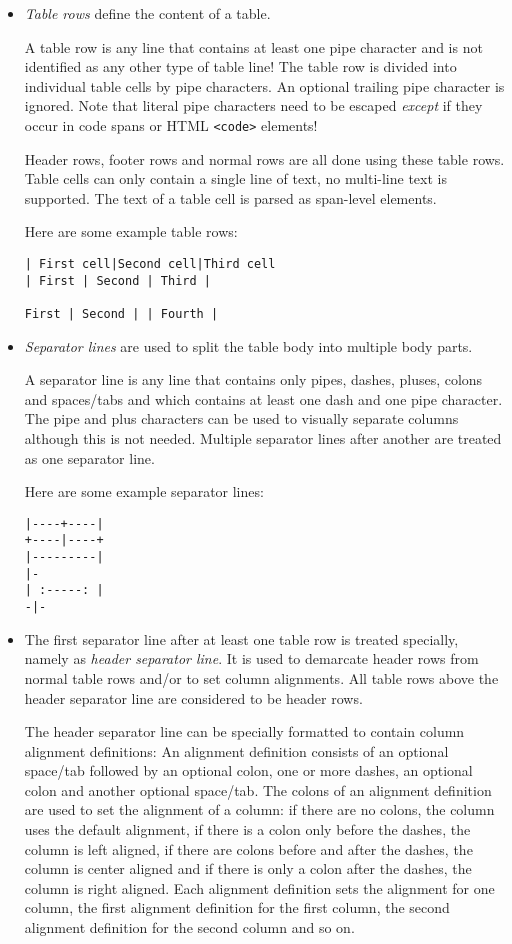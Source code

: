 \documentclass[a4paper]{article}
\begin{document}
\begin{itemize}
\item
  \emph{Table rows} define the content of a table.

  A table row is any line that contains at least one pipe character and
  is not identified as any other type of table line! The table row is
  divided into individual table cells by pipe characters. An optional
  trailing pipe character is ignored. Note that literal pipe characters
  need to be escaped \emph{except} if they occur in code spans or HTML
  \texttt{\textless{}code\textgreater{}} elements!

  Header rows, footer rows and normal rows are all done using these
  table rows. Table cells can only contain a single line of text, no
  multi-line text is supported. The text of a table cell is parsed as
  span-level elements.

  Here are some example table rows:

\begin{verbatim}
| First cell|Second cell|Third cell
| First | Second | Third |

First | Second | | Fourth |
\end{verbatim}
\item
  \emph{Separator lines} are used to split the table body into multiple
  body parts.

  A separator line is any line that contains only pipes, dashes, pluses,
  colons and spaces/tabs and which contains at least one dash and one
  pipe character. The pipe and plus characters can be used to visually
  separate columns although this is not needed. Multiple separator lines
  after another are treated as one separator line.

  Here are some example separator lines:

\begin{verbatim}
|----+----|
+----|----+
|---------|
|-
| :-----: |
-|-
\end{verbatim}
\item
  The first separator line after at least one table row is treated
  specially, namely as \emph{header separator line}. It is used to
  demarcate header rows from normal table rows and/or to set column
  alignments. All table rows above the header separator line are
  considered to be header rows.

  The header separator line can be specially formatted to contain column
  alignment definitions: An alignment definition consists of an optional
  space/tab followed by an optional colon, one or more dashes, an
  optional colon and another optional space/tab. The colons of an
  alignment definition are used to set the alignment of a column: if
  there are no colons, the column uses the default alignment, if there
  is a colon only before the dashes, the column is left aligned, if
  there are colons before and after the dashes, the column is center
  aligned and if there is only a colon after the dashes, the column is
  right aligned. Each alignment definition sets the alignment for one
  column, the first alignment definition for the first column, the
  second alignment definition for the second column and so on.


\end{itemize}
\end{document}
